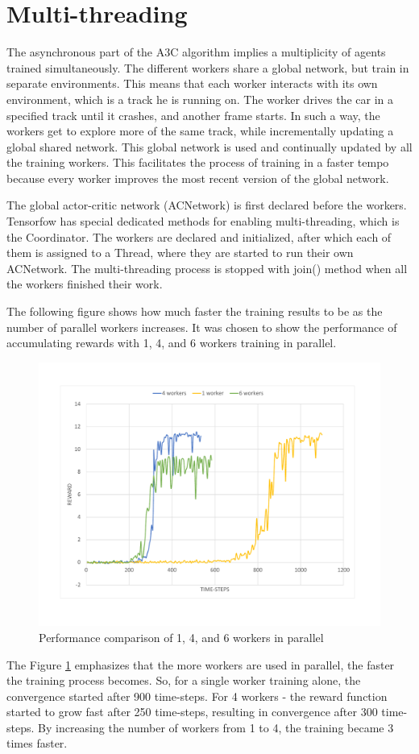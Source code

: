 \section{Multi-threading}\label{Multi-threading}
The asynchronous part of the A3C algorithm implies a multiplicity of agents trained simultaneously. The different workers share a global network, but train in separate environments. This means that each worker interacts with its own environment, which is a track he is running on. The worker drives the car in a specified track until it crashes, and another frame starts. In such a way, the workers get to explore more of the same track, while incrementally updating a global shared network. This global network is used and continually updated by all the training workers. This facilitates the process of training in a faster tempo because every worker improves the most recent version of the global network.

The global actor-critic network (ACNetwork) is first declared before the workers. Tensorfow has special dedicated methods for enabling multi-threading, which is the Coordinator. The workers are declared and initialized, after which each of them is assigned to a Thread, where they are started to run their own ACNetwork. The multi-threading process is stopped with join() method when all the workers finished their work.

The following figure shows how much faster the training results to be as the number of parallel workers increases. It was chosen to show the performance of accumulating rewards with 1, 4, and  6 workers training in parallel.
\begin{figure}[H]
	\centering
	\includegraphics[width=\textwidth]{Figures/Workers}
	\caption{Performance comparison of 1, 4, and 6 workers in parallel}
	\label{fig:Workers}
\end{figure}
 The Figure \ref{fig:Workers} emphasizes that the more workers are used in parallel, the faster the training process becomes. So, for a single worker training alone, the convergence started after 900 time-steps. For 4 workers - the reward function started to grow fast after 250 time-steps, resulting in convergence after 300 time-steps. By increasing the number of workers from 1 to 4, the training became 3 times faster.
 
